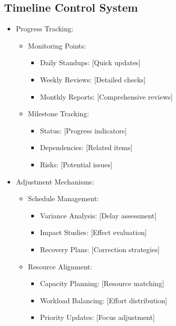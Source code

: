 \documentclass{article}
\begin{document}
\subsection{Timeline Control System}
\begin{itemize}
    \item Progress Tracking:
    \begin{itemize}
        \item Monitoring Points:
        \begin{itemize}
            \item Daily Standups: [Quick updates]
            \item Weekly Reviews: [Detailed checks]
            \item Monthly Reports: [Comprehensive reviews]
        \end{itemize}
        \item Milestone Tracking:
        \begin{itemize}
            \item Status: [Progress indicators]
            \item Dependencies: [Related items]
            \item Risks: [Potential issues]
        \end{itemize}
    \end{itemize}
    \item Adjustment Mechanisms:
    \begin{itemize}
        \item Schedule Management:
        \begin{itemize}
            \item Variance Analysis: [Delay assessment]
            \item Impact Studies: [Effect evaluation]
            \item Recovery Plans: [Correction strategies]
        \end{itemize}
        \item Resource Alignment:
        \begin{itemize}
            \item Capacity Planning: [Resource matching]
            \item Workload Balancing: [Effort distribution]
            \item Priority Updates: [Focus adjustment]
        \end{itemize}
    \end{itemize}
\end{itemize}
\end{document}
